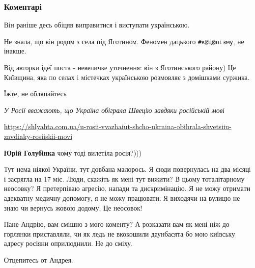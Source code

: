  
 
 
 
 
\subsubsection{Коментарі}
\label{sec:30_06_2021.fb.sajchuk_andrej.1.shevchenko_mova_sssr_futbol.cmt}

\begin{itemize}
Він раніше десь обіцяв виправитися і виступати українською.

Не знала, що він родом з села під Яготином. Феномен дацького \verb|#к@ц@пізму|, не інакше.

Від авторки ідеї поста - невеличке уточнення: він з Яготинського району) Це
Київщина, яка по селах і містечках українською розмовляє з домішками суржика.

Їжте, не обляпайтесь\par
{\em У Росії вважають, що Україна обіграла Швецію завдяки російській мові}\par
\url{https://shlyahta.com.ua/u-rosii-vvazhaiut-shcho-ukraina-obihrala-shvetsiiu-zavdiaky-rosiiskii-movi}

\textbf{Юрій Голубінка} чому тоді вилетіла росія?)))


Тут нема ніякої України, тут довбана малорось. Я сюди повернулась на два місяці
і засрягла на 17 міс. Люди, скажіть як мені тут вижити? В цьому тоталітарному
неосовку? Я претерпіваю агресію, напади та дискримінацію. Я не можу отримати
адекватну медичну допомогу, я не можу працювати. Я виходячи на вулицю не знаю
чи вернусь жовою додому. Це неосовок!


Пане Андрію, вам смішно з мого коменту? А розказати вам як мені ніж до горлянки
приставляли, чи як ледь не вкокошили даунбасята бо мою київську адресу росіяни
оприлюднили. Не до сміху.

Отцепитесь от Андрея.


\end{itemize}
